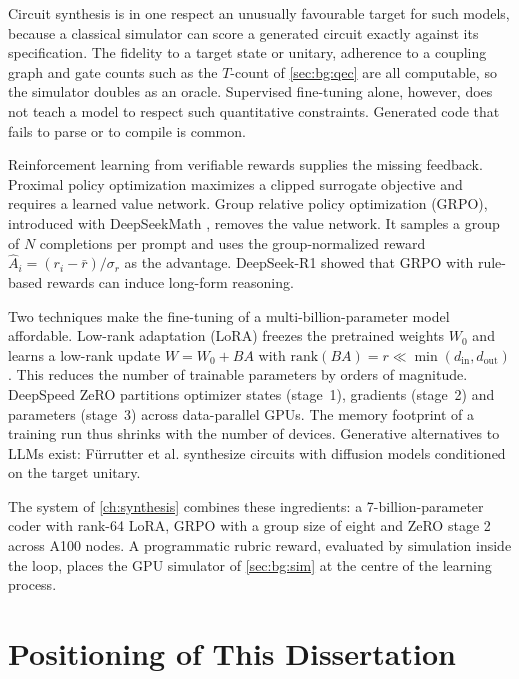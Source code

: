 Circuit synthesis is in one respect an unusually favourable target for such models, because a classical simulator can score a generated circuit exactly against its specification. The fidelity to a target state or unitary, adherence to a coupling graph and gate counts such as the $T$-count of \cref{sec:bg:qec} are all computable, so the simulator doubles as an oracle. Supervised fine-tuning alone, however, does not teach a model to respect such quantitative constraints. Generated code that fails to parse or to compile is common.

Reinforcement learning from verifiable rewards supplies the missing feedback. Proximal policy optimization \cite{schulman2017ppo} maximizes a clipped surrogate objective and requires a learned value network. Group relative policy optimization (GRPO), introduced with DeepSeekMath \cite{shao2024deepseekmath}, removes the value network. It samples a group of $N$ completions per prompt and uses the group-normalized reward $\hat{A}_i=(r_i-\bar{r})/\sigma_r$ as the advantage. DeepSeek-R1 \cite{deepseek2025r1} showed that GRPO with rule-based rewards can induce long-form reasoning.

Two techniques make the fine-tuning of a multi-billion-parameter model affordable. Low-rank adaptation (LoRA) \cite{hu2022lora} freezes the pretrained weights $W_0$ and learns a low-rank update $W=W_0+BA$ with $\mathrm{rank}(BA)=r\ll\min(d_{\mathrm{in}},d_{\mathrm{out}})$. This reduces the number of trainable parameters by orders of magnitude. DeepSpeed ZeRO \cite{rajbhandari2020zero} partitions optimizer states (stage~1), gradients (stage~2) and parameters (stage~3) across data-parallel GPUs. The memory footprint of a training run thus shrinks with the number of devices. Generative alternatives to LLMs exist: F{\"u}rrutter et al. \cite{furrutter2024genqc} synthesize circuits with diffusion models conditioned on the target unitary.

The \rubriq{} system of \cref{ch:synthesis} \cite{guo2026rubriq} combines these ingredients: a 7-billion-parameter coder with rank-64 LoRA, GRPO with a group size of eight and ZeRO stage 2 across A100 nodes. A programmatic rubric reward, evaluated by \cudaq{} simulation inside the loop, places the GPU simulator of \cref{sec:bg:sim} at the centre of the learning process.

\section{Positioning of This Dissertation}\label{sec:bg:summary}

